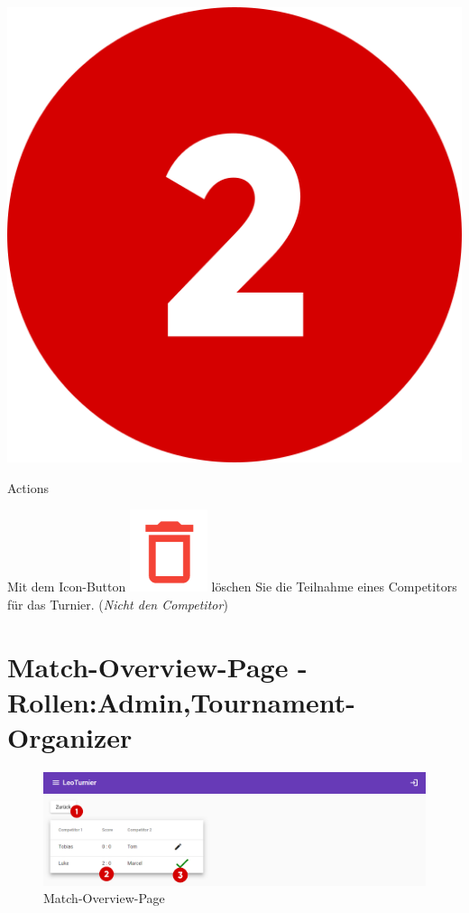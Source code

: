 \includegraphics[scale=0.05]{pics/user-guide/numbers/number-2.png} \begin{LARGE} Actions \end{LARGE}

Mit dem Icon-Button \includegraphics[scale=0.3]{pics/user-guide/delete-icon.PNG} löschen Sie die Teilnahme eines Competitors für das Turnier. (\textit{Nicht den Competitor})

\newpage
\section{Match-Overview-Page - Rollen:Admin,Tournament-Organizer}
\begin{figure}[H]
    \includegraphics[scale=0.4]{pics/user-guide/match-overview-page.PNG} 
    \caption{Match-Overview-Page}
\end{figure}

